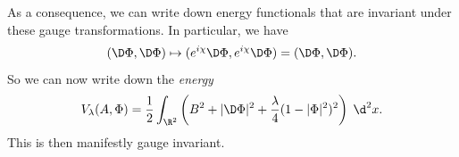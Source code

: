 \documentclass[a4paper]{article}
\begin{document}
As a consequence, we can write down energy functionals that are invariant under these gauge transformations. In particular, we have
\[
  (\D \Phi, \D \Phi) \mapsto (e^{i\chi} \D \Phi, e^{i\chi} \D \Phi) = (\D \Phi, \D \Phi).
\]
So we can now write down the  \emph{energy}
\[
  V_\lambda(A, \Phi) = \frac{1}{2} \int_{\R^2} \left(B^2 + |\D \Phi|^2 + \frac{\lambda}{4} (1 - |\Phi|^2)^2\right)\;\d^2 x.
\]
This is then manifestly gauge invariant.
%
%
%
%
%
\end{document}

